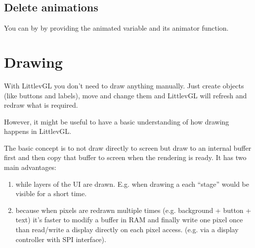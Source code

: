 \documentclass[letterpaper,10pt,english]{sphinxmanual}
\begin{document}
\subsection{Delete animations}
\label{\detokenize{overview/animations:delete-animations}}
You can  by  by providing the animated variable and its animator function.


\section{Drawing}
\label{\detokenize{overview/drawing:drawing}}\label{\detokenize{overview/drawing::doc}}
With LittlevGL you don’t need to draw anything manually. Just create objects (like buttons and labels), move and change them and LittlevGL will refresh and redraw what is required.

However, it might be useful to have a basic understanding of how drawing happens in LittlevGL.

The basic concept is to not draw directly to screen but draw to an internal buffer first and then copy that buffer to screen when the rendering is ready. It has two main advantages:
\begin{enumerate}
\def\theenumi{\arabic{enumi}}
\def\labelenumi{\theenumi .}
\makeatletter\def\p@enumii{\p@enumi \theenumi .}\makeatother
\item {} 
 while layers of the UI are drawn. E.g. when drawing a  each “stage” would be visible for a short time.

\item {} 
 because when pixels are redrawn multiple times (e.g. background + button + text) it’s faster to modify a buffer in RAM and finally write one pixel once
than read/write a display directly on each pixel access. (e.g. via a display controller with SPI interface).

\end{enumerate}
\end{document}
